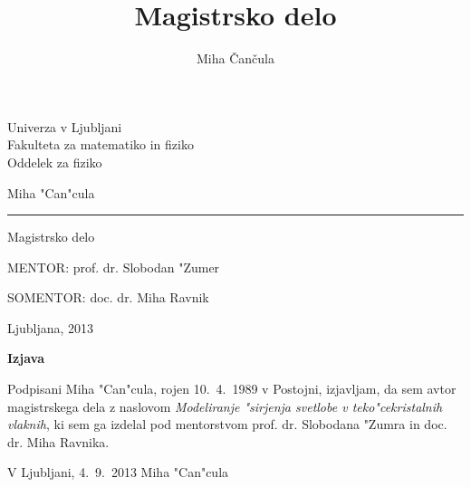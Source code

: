 \documentclass[12pt,twoside,openright,final]{report}
\title{Magistrsko delo}
\author{Miha \v Can\v cula}
\begin{document}
\thispagestyle{empty}
\begin{center}
{\Large\sc Univerza v Ljubljani \\
\medskip
Fakulteta za matematiko in fiziko\\
\medskip
Oddelek za fiziko}\\

\vfill

\bigskip\bigskip\bigskip\bigskip\bigskip\bigskip\bigskip\bigskip
\bigskip\bigskip\bigskip

{\Large Miha "Can"cula}\\

\bigskip\bigskip\bigskip

{\LARGE{}}

\bigskip

{\LARGE{}}

\vskip 8mm \hrule height0.5mm \vskip 12mm


{\Large Magistrsko delo}\\

\bigskip\bigskip\bigskip\bigskip\bigskip\bigskip\bigskip\bigskip\bigskip\bigskip\bigskip\bigskip\bigskip\bigskip\bigskip

{\Large MENTOR: prof. dr. Slobodan "Zumer}\\ \smallskip\smallskip\smallskip

{\Large SOMENTOR: doc. dr. Miha Ravnik}

\bigskip\bigskip

\vfill
{\Large Ljubljana, 2013}
\end{center}

\newpage

\newpage

\thispagestyle{empty}

\centerline{}

\vfill

\centerline{\bf Izjava}
\bigskip\bigskip
\noindent
Podpisani Miha "Can"cula, rojen 10.~4.~1989 v Postojni, izjavljam, da sem avtor magistrskega dela z naslovom \emph{Modeliranje "sirjenja svetlobe v teko"cekristalnih vlaknih}, ki sem ga izdelal pod mentorstvom prof. dr. Slobodana "Zumra in doc. dr. Miha Ravnika.

\bigskip
\bigskip

\noindent
V Ljubljani, 4.~9.~2013 \hfill Miha "Can"cula

\vfill
\end{document}
